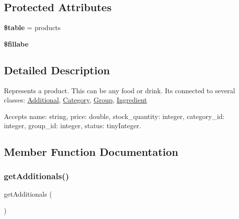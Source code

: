 \subsection*{Protected Attributes}
\begin{DoxyCompactItemize}
\item 
\mbox{\label{class_app_1_1_models_1_1_product_1_1_product_ae8876a14058f368335baccf35af4a22b}} 
{\bfseries \$table} = \textquotesingle{}products\textquotesingle{}
\item 
{\bfseries \$fillabe}
\end{DoxyCompactItemize}


\subsection{Detailed Description}
Represents a product. This can be any food or drink. It\textquotesingle{}s connected to several classes\+: \mbox{\hyperlink{class_app_1_1_models_1_1_product_1_1_additional}{Additional}}, \mbox{\hyperlink{class_app_1_1_models_1_1_product_1_1_category}{Category}}, \mbox{\hyperlink{class_app_1_1_models_1_1_product_1_1_group}{Group}}, \mbox{\hyperlink{class_app_1_1_models_1_1_product_1_1_ingredient}{Ingredient}}

Accepts name\+: string, price\+: double, stock\+\_\+quantity\+: integer, category\+\_\+id\+: integer, group\+\_\+id\+: integer, status\+: tiny\+Integer. 

\subsection{Member Function Documentation}
\mbox{\label{class_app_1_1_models_1_1_product_1_1_product_a6f78a9ab9472f9f82fe70dd84d6c5e5c}} 
\subsubsection{\texorpdfstring{get\+Additionals()}{getAdditionals()}}
{\footnotesize\ttfamily get\+Additionals (\begin{DoxyParamCaption}{ }\end{DoxyParamCaption})}

